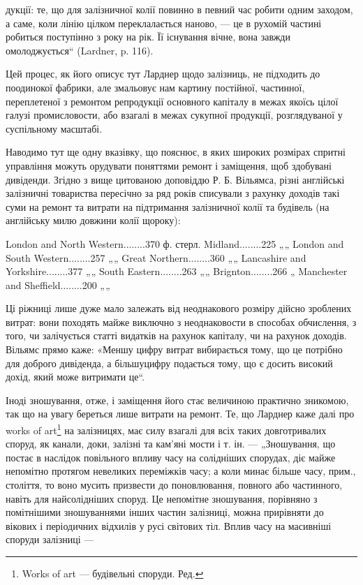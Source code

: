 дукції: те, що для залізничної колії повинно в певний час робити одним заходом, а саме, коли лінію
цілком переклалається наново, — це в рухомій частині робиться поступінно з року на рік. Її існування
вічне, вона завжди омолоджується“ (Lardner, p. 116).

Цей процес, як його описує тут Ларднер щодо залізниць, не підходить до поодинокої фабрики, але
змальовує нам картину постійної, частинної, переплетеної з ремонтом репродукції основного капіталу в
межах якоїсь цілої галузі промисловости, або взагалі в межах сукупної продукції, розглядуваної у
суспільному масштабі.

Наводимо тут ще одну вказівку, що пояснює, в яких широких розмірах спритні управління можуть
орудувати поняттями ремонт і заміщення, щоб здобувані дивіденди. Згідно з вище цитованою доповіддю
Р. Б. Вільямса, різні англійські залізничні товариства пересічно за ряд років списували з рахунку
доходів такі суми на ремонт та витрати на підтримання залізничної колії та будівель (на англійську
милю довжини колії щороку):

London and North Western........370 ф. стерл.
Midland........225 „„
London and South Western........257 „„
Great Northern........360 „„
Lancashire and Yorkshire........377 „„
South Eastern........263 „„
Brignton........266 „
Manchester and Sheffield........200 „„

Ці ріжниці лише дуже мало залежать від неоднакового розміру дійсно зроблених витрат: вони походять
майже виключно з неоднаковости в способах обчислення, з того, чи залічується статті видатків на
рахунок капіталу, чи на рахунок доходів. Вільямс прямо каже: «Меншу цифру витрат вибирається тому,
що це потрібно для доброго дивіденда, а більшуцифру подається тому, що є досить високий дохід, який
може витримати це“.

Іноді зношування, отже, і заміщення його стає величиною практично зникомою, так що на увагу береться
лише витрати на ремонт. Те, що Ларднер каже далі про works of art\footnote*{
Works of art — будівельні споруди. Ред.
} на залізницях, має силу взагалі
для всіх таких довготривалих споруд, як канали, доки, залізні та кам’яні мости і т. ін. —
„Зношування, що постає в наслідок повільного впливу часу на солідніших спорудах, діє майже непомітно
протягом невеликих переміжків часу; а коли минає більше часу, прим., століття, то воно мусить
призвести до поновлювання, повного або частинного, навіть для найсолідніших споруд. Це непомітне
зношування, порівняно з помітнішими зношуваннями інших частин залізниці, можна прирівняти до вікових
і періодичних відхилів у русі світових тіл. Вплив часу на масивніші споруди залізниці —